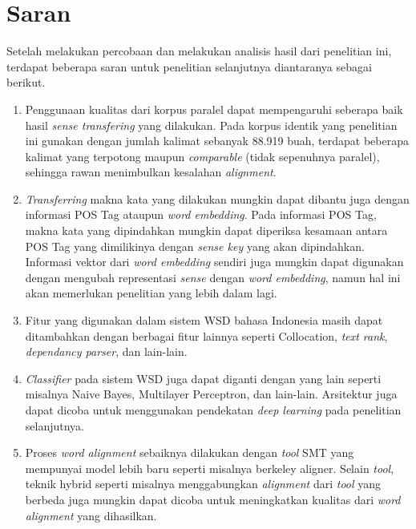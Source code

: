 \section{Saran}
Setelah melakukan percobaan dan melakukan analisis hasil dari penelitian ini, terdapat beberapa saran untuk penelitian selanjutnya diantaranya sebagai berikut.

\begin{enumerate}
	\item Penggunaan kualitas dari korpus paralel dapat mempengaruhi seberapa baik hasil \textit{sense transfering} yang dilakukan. Pada korpus identik yang penelitian ini gunakan dengan jumlah kalimat sebanyak 88.919 buah, terdapat beberapa kalimat yang terpotong maupun \textit{comparable} (tidak sepenuhnya paralel), sehingga rawan menimbulkan kesalahan \textit{alignment}.
	\item \textit{Transferring} makna kata yang dilakukan mungkin dapat dibantu juga dengan informasi POS Tag ataupun \textit{word embedding}. Pada informasi POS Tag, makna kata yang dipindahkan mungkin dapat diperiksa kesamaan antara POS Tag yang dimilikinya dengan \textit{sense key} yang akan dipindahkan. Informasi vektor dari \textit{word embedding} sendiri juga mungkin dapat digunakan dengan mengubah representasi \textit{sense} dengan \textit{word embedding}, namun hal ini akan memerlukan penelitian yang lebih dalam lagi.
	\item Fitur yang digunakan dalam sistem WSD bahasa Indonesia masih dapat ditambahkan dengan berbagai fitur lainnya seperti Collocation, \textit{text rank}, \textit{dependancy parser}, dan lain-lain.
	\item \textit{Classifier} pada sistem WSD juga dapat diganti dengan yang lain seperti misalnya Naive Bayes, Multilayer Perceptron, dan lain-lain. Arsitektur juga dapat dicoba untuk menggunakan pendekatan \textit{deep learning} pada penelitian selanjutnya.
	\item Proses \textit{word alignment} sebaiknya dilakukan dengan \textit{tool} SMT yang mempunyai model lebih baru seperti misalnya berkeley aligner. Selain \textit{tool}, teknik hybrid seperti misalnya menggabungkan \textit{alignment} dari \textit{tool} yang berbeda juga mungkin dapat dicoba untuk meningkatkan kualitas dari \textit{word alignment} yang dihasilkan.
\end{enumerate}